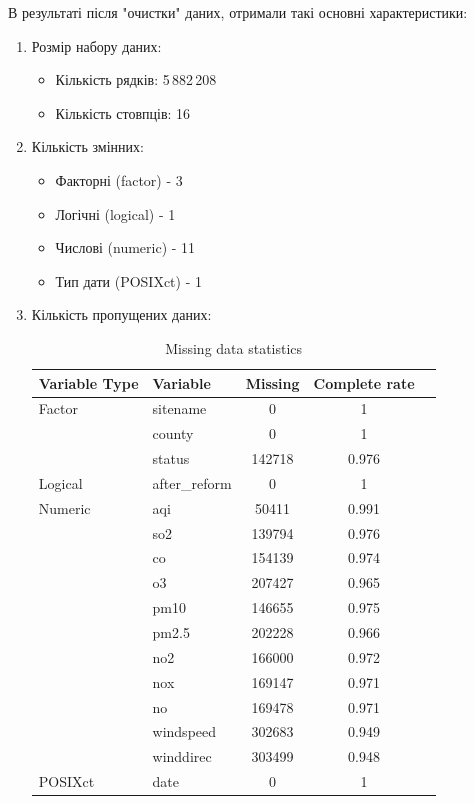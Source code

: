 \documentclass{article}
\begin{document}
В результаті після "очистки" даних, отримали такі основні характеристики:
 \begin{enumerate}      
    \item Розмір набору даних: 
        \begin{itemize}
            \item Кількість рядків: 5\,882\,208
            \item Кількість стовпців: 16
        \end{itemize} 
    \item Кількість змінних:
        \begin{itemize}
            \item Факторні (factor)  - 3
            \item Логічні (logical) -  1
            \item Числові (numeric) -  11
            \item Тип дати (POSIXct) -  1 
        \end{itemize} 

    \pagebreak
    \item Кількість пропущених даних:
    
    \begin{table}[h!]
    \centering
\begin{tabular}{llccc}

\toprule
\textbf{Variable Type} & \textbf{Variable} & \textbf{Missing} & \textbf{Complete rate} \\
\midrule
Factor   & sitename      & 0      & 1     \\
         & county        & 0      & 1     \\
         & status        & 142718 & 0.976 \\
Logical  & after\_reform & 0      & 1     \\
Numeric  & aqi           & 50411  & 0.991 \\
         & so2           & 139794 & 0.976 \\
         & co            & 154139 & 0.974 \\
         & o3            & 207427 & 0.965 \\
         & pm10          & 146655 & 0.975 \\
         & pm2.5         & 202228 & 0.966 \\
         & no2           & 166000 & 0.972 \\
         & nox           & 169147 & 0.971 \\
         & no            & 169478 & 0.971 \\
         & windspeed     & 302683 & 0.949 \\
         & winddirec     & 303499 & 0.948 \\
POSIXct  & date          & 0      & 1     \\
\bottomrule
\end{tabular}
\caption{Missing data statistics}
\label{tab:summary}
\end{table}


\end{enumerate}
\end{document}
